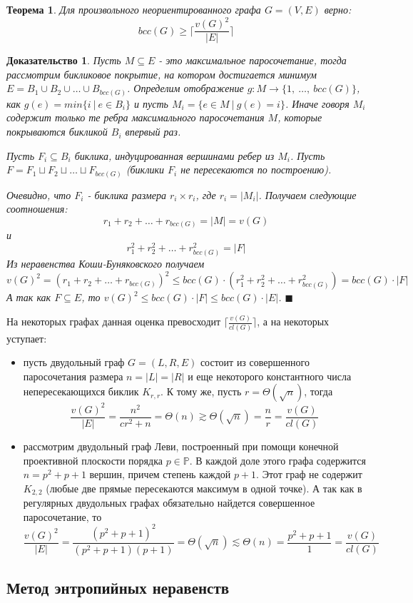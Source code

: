 \documentclass[a4paper]{article}
\newtheorem*{mtheorem}{Теорема}
\newtheorem*{msolution}{Доказательство}
\begin{document}
\begin{mtheorem}
    Для произвольного неориентированного графа $G = (V, E)$ верно: $$bcc(G)\geq \bigg\lceil\frac{v(G)^2}{|E|}\bigg\rceil$$
\end{mtheorem}

\begin{msolution}
	Пусть $M\subseteq E$ - это максимальное паросочетание, тогда рассмотрим бикликовое покрытие, 
	на котором достигается минимум $E = B_1\cup B_2\cup \ldots \cup B_{bcc(G)}$. Определим 
	отображение $g:M\rightarrow \{1,\ \ldots,\ bcc(G)\}$, как $g(e) = min\{i\ |\ e\in B_i\}$ и пусть 
	$M_i = \{e\in M\ |\ g(e) = i\}$. Иначе говоря $M_i$ содержит только те ребра максимального 
	паросочетания $M$, которые покрываются бикликой $B_i$ впервый раз.
	
	Пусть $F_i \subseteq B_i$ биклика, индуцированная вершинами ребер из $M_i$. Пусть 
	$F = F_1\sqcup F_2\sqcup \ldots \sqcup F_{bcc(G)}$ (биклики $F_i$ не пересекаются по построению).
	
	Очевидно, что $F_i$ - биклика размера $r_i\times r_i$, где $r_i = |M_i|$. Получаем следующие 
	соотношения: $$r_1 + r_2 + \ldots + r_{bcc(G)} = |M| = v(G)$$ и 
	$$r_1^2 + r_2^2 + \ldots + r_{bcc(G)}^2 = |F|$$ Из неравенства Коши-Буняковского получаем 
	$$v(G)^2 = (r_1 + r_2 + \ldots + r_{bcc(G)})^2 \leq bcc(G)\cdot (r_1^2 + r_2^2 + \ldots + r_{bcc(G)}^2) = bcc(G)\cdot |F|$$
	А так как $F \subseteq E$, то $v(G)^2\leq bcc(G)\cdot |F| \leq bcc(G)\cdot |E|$. 
	$\blacksquare$
\end{msolution}

На некоторых графах данная оценка превосходит $\Big\lceil\frac{v(G)}{cl(G)}\Big\rceil$, 
а на некоторых уступает:
\begin{itemize}
    \item пусть двудольный граф $G = (L, R, E)$ состоит из совершенного паросочетания размера 
    $n = |L| = |R|$ и еще некоторого константного числа непересекающихся биклик $K_{r,r}$. 
    К тому же, пусть $r = \Theta(\sqrt{n})$, тогда $$\frac{v(G)^2}{|E|} = \frac{n^2}{cr^2 + n} = 
    \Theta(n) \gtrsim \Theta(\sqrt{n}) = \frac{n}{r} = \frac{v(G)}{cl(G)}$$ 
    \item рассмотрим двудольный граф Леви, построенный при помощи конечной проективной плоскости порядка 
    $p\in \mathbb{P}$. В каждой доле этого графа содержится $n = p^2 + p + 1$ вершин, причем степень 
    каждой $p+1$. Этот граф не содержит $K_{2,2}$ (любые две прямые пересекаются максимум в одной точке). 
    А так как в регулярных двудольных графах обязательно найдется совершенное паросочетание, то 
    $$\frac{v(G)^2}{|E|} = \frac{(p^2 + p + 1)^2}{(p^2+p+1)(p+1)} = \Theta(\sqrt{n}) \lesssim 
    \Theta(n) = \frac{p^2 + p + 1}{1} = \frac{v(G)}{cl(G)}$$
\end{itemize}




\subsection{Метод энтропийных неравенств}






\end{document}
